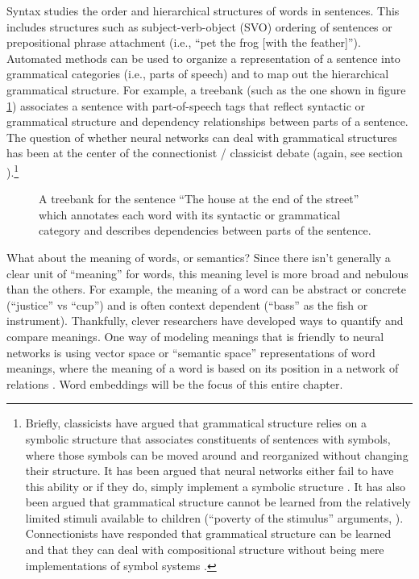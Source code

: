 Syntax studies the order and hierarchical structures of words in sentences. This includes structures such as subject-verb-object (SVO) ordering of sentences or prepositional phrase attachment (i.e., ``pet the frog [with the feather]''). Automated methods can be used to organize a representation of a sentence into grammatical categories (i.e., parts of speech) and to map out the hierarchical grammatical structure. For example, a treebank (such as the one shown in figure \ref{treeBank}) associates a sentence with part-of-speech tags that reflect syntactic or grammatical structure and dependency relationships between parts of a sentence. The question of whether neural networks can deal with grammatical structures has been at the center of the connectionist / classicist debate (again, see section ).\footnote{Briefly, classicists have argued that grammatical structure relies on a symbolic structure that associates constituents of sentences with symbols, where those symbols can be moved around and reorganized without changing their structure. It has been argued that neural networks either fail to have this ability or if they do, simply implement a symbolic structure \cite{fodor1988connectionism}. It has also been argued that grammatical structure cannot be learned from the relatively limited stimuli available to children (``poverty of the stimulus'' arguments, \cite{berwick2011poverty}). Connectionists have responded that grammatical structure can be learned \cite{elman1996rethinking} and that they can deal with compositional structure without being mere implementations of symbol systems \cite{smolensky1988proper}.}

\begin{figure}[h]
\centering
{}
\caption[From ]{A treebank for the sentence ``The house at the end of the street'' which annotates each word with its syntactic or grammatical category and describes dependencies between parts of the sentence.}
\label{treeBank}
\end{figure}

What about the meaning of words, or semantics? Since there isn't generally a clear unit of ``meaning'' for words, this meaning level is more broad and nebulous than the others. For example, the meaning of a word can be abstract or concrete (``justice'' vs ``cup'') and is often context dependent (``bass'' as the fish or instrument). Thankfully, clever researchers have developed ways to quantify and compare meanings. One way of modeling meanings that is friendly to neural networks is using vector space or ``semantic space'' representations of word meanings, where the meaning of a word is based on its position in a network of relations \cite{erk2012vector}. Word embeddings will be the focus of this entire chapter.

